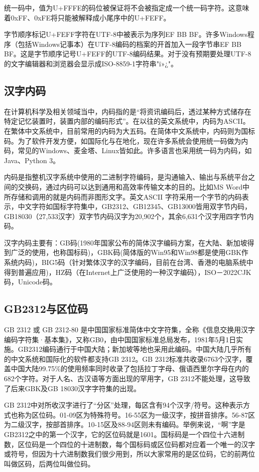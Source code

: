 统一码中，值为U+FFFE的码位被保证将不会被指定成一个统一码字符。这意味着0xFF、0xFE将只能被解释成小尾序中的U+FEFF。

字节顺序标记U+FEFF字符在UTF-8中被表示为序列EF BB BF。许多Windows程序（包括Windows记事本）在UTF-8编码的档案的开首加入一段字节串EF BB BF。这是字节顺序记号U+FEFF的UTF-8编码结果。对于没有预期要处理UTF-8的文字编辑器和浏览器会显示成ISO-8859-1字符串"ï»¿"。

\subsection{汉字内码}

在计算机科学及相关领域当中，内码指的是“将资讯编码后，透过某种方式储存在特定记忆装置时，装置内部的编码形式”。在以往的英文系统中，内码为ASCII。 在繁体中文系统中，目前常用的内码为大五码。在简体中文系统中，内码则为国标码。为了软件开发方便，如国际化与在地化，现在许多系统会使用统一码做为内码，常见的Windows、麦金塔、Linux皆如此。许多语言也采用统一码为内码，如Java、Python 3。

内码是指整机汉字系统中使用的二进制字符编码，是沟通输入、输出与系统平台之间的交换码，通过内码可以达到通用和高效率传输文本的目的。比如MS Word中所存储和调用的就是内码而非图形文字。英文ASCII 字符采用一个字节的内码表示，中文字符如国标字符集中，GB2312、GB12345、GB13000皆用双字节内码，GB18030（27,533汉字）双字节内码汉字为20,902个，其余6,631个汉字用四字节内码。

汉字内码主要有：GB码(1980年国家公布的简体汉字编码方案，在大陆、新加坡得到广泛的使用，也称国标码)，GBK码(简体版的Win95和Win98都是使用GBK作系统内码)，BIG5码（针对繁体汉字的汉字编码，目前在台湾、香港的电脑系统中得到普遍应用)，HZ码（在Internet上广泛使用的一种汉字编码），ISO－2022CJK码，Unicode码。

\subsection{GB2312与区位码}
GB 2312 或 GB 2312-80 是中国国家标准简体中文字符集，全称《信息交换用汉字编码字符集·基本集》，又称GB0，由中国国家标准总局发布，1981年5月1日实施。GB2312编码通行于中国大陆；新加坡等地也采用此编码。中国大陆几乎所有的中文系统和国际化的软件都支持GB 2312。GB 2312标准共收录6763个汉字，覆盖中国大陆99.75\%的使用频率同时收录了包括拉丁字母、俄语西里尔字母在内的682个字符。对于人名、古汉语等方面出现的罕用字，GB 2312不能处理，这导致了后来GBK及GB 18030汉字字符集的出现。

GB 2312中对所收汉字进行了“分区”处理，每区含有94个汉字/符号。这种表示方式也称为区位码。01-09区为特殊符号。16-55区为一级汉字，按拼音排序。56-87区为二级汉字，按部首排序。10-15区及88-94区则未有编码。举例来说，“啊”字是GB2312之中的第一个汉字，它的区位码就是1601。国标码是一个四位十六进制数，区位码是一个四位的十进制数，每个国标码或区位码都对应着一个唯一的汉字或符号，但因为十六进制数我们很少用到，所以大家常用的是区位码，它的前两位叫做区码，后两位叫做位码。

